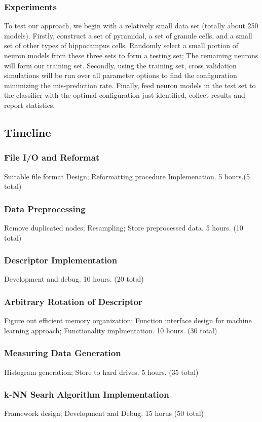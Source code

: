 \documentclass[letterpaper,11pt,oneside]{article}
\begin{document}
\subsubsection{Experiments}
To test our approach, we begin with a relatively small data set (totally about 250 models). Firstly, construct a set of pyramidal, a set of granule cells, and a small set of other types of hippocampus cells. Randomly select a small portion of neuron models from these three sets to form a testing set; The remaining neurons will form our training set. Secondly, using the training set, cross validation simulations will be run over all parameter options to find the configuration minimizing the mis-prediction rate. Finally, feed neuron models in the test set to the classifier with the optimal configuration just identified, collect results and report statistics.

\subsection{Timeline}
\subsubsection{File I/O and Reformat} 
Suitable file format Design; Reformatting procedure Implemenation. 5 hours.(5 total)
\subsubsection{Data Preprocessing}
Remove duplicated nodes; Resampling; Store preprocessed data. 5 hours. (10 total)
\subsubsection{Descriptor Implementation}
Development and debug. 10 hours. (20 total)
\subsubsection{Arbitrary Rotation of Descriptor}
Figure out efficient memory organization; Function interface design for machine learning approach; Functionality implmentation. 10 hours. (30 total)
\subsubsection{Measuring Data Generation}
Histogram generation; Store to hard drives. 5 hours. (35 total)
\subsubsection{k-NN Searh  Algorithm Implementation}
Framework design; Development and Debug. 15 horus (50 total)
\end{document}
